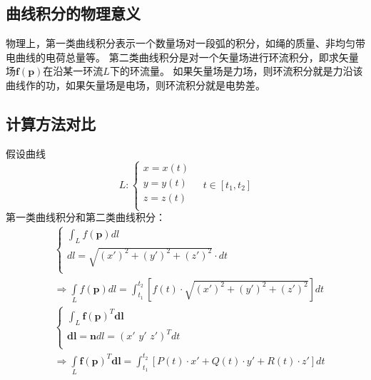 \subsection{曲线积分的物理意义}

物理上，第一类曲线积分表示一个数量场对一段弧的积分，如绳的质量、非均匀带电曲线的电荷总量等。
第二类曲线积分是对一个矢量场进行环流积分，即求矢量场$\boldsymbol{f}\left( \boldsymbol{p} \right) $在沿某一环流$L$下的环流量。
如果矢量场是力场，则环流积分就是力沿该曲线作的功，如果矢量场是电场，则环流积分就是电势差。

\subsection{计算方法对比}

假设曲线
\[
L:\begin{cases}
	x=x\left( t \right)\\
	y=y\left( t \right)\\
	z=z\left( t \right)\\
\end{cases} \quad t\in \left[ t_1,t_2 \right]
\]
第一类曲线积分和第二类曲线积分：
\begin{align*}
&\begin{cases}
	\int_L{f\left( \boldsymbol{p} \right) dl}\\
	dl=\sqrt{\left( x' \right) ^2+\left( y' \right) ^2+\left( z' \right) ^2}\cdot dt\\
\end{cases} \\
&\Rightarrow \int\limits_L{f\left( \boldsymbol{p} \right) dl}=\int_{t_1}^{t_2}{\left[ f\left( t \right) \cdot \sqrt{\left( x' \right) ^2+\left( y' \right) ^2+\left( z' \right) ^2} \right] dt} \\
&\begin{cases}
	\int_L{\boldsymbol{f}\left( \boldsymbol{p} \right) ^T\boldsymbol{dl}}\\
	\boldsymbol{dl}=\mathbf{n}dl=\left( x'\,\,y'\,\,z' \right) ^Tdt\\
\end{cases} \\
&\Rightarrow \int\limits_L{\boldsymbol{f}\left( \boldsymbol{p} \right) ^T\boldsymbol{dl}}=\int_{t_1}^{t_2}{\left[ P\left( t \right) \cdot x'+Q\left( t \right) \cdot y'+R\left( t \right) \cdot z' \right] dt}
\end{align*}



